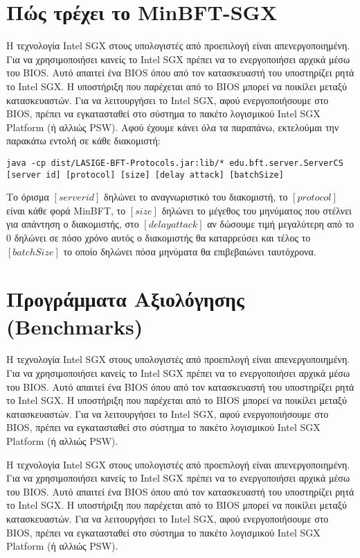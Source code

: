 \section{Πώς τρέχει το MinBFT-SGX}
Η τεχνολογία Intel SGX στους υπολογιστές από προεπιλογή είναι απενεργοποιημένη. Για να χρησιμοποιήσει κανείς το Intel SGX πρέπει να το ενεργοποιήσει αρχικά μέσω του BIOS. Αυτό απαιτεί ένα BIOS όπου από τον κατασκευαστή του υποστηρίζει ρητά το Intel SGX. Η υποστήριξη που παρέχεται από το BIOS μπορεί να ποικίλει μεταξύ κατασκευαστών. Για να λειτουργήσει το Intel SGX, αφού ενεργοποιήσουμε στο BIOS, πρέπει να εγκατασταθεί στο σύστημα το πακέτο λογισμικού Intel SGX Platform (ή αλλιώς PSW)\cite{linuxsgx}. 
Αφού έχουμε κάνει όλα τα παραπάνω, εκτελούμαι την παρακάτω εντολή σε κάθε διακομιστή: 
\begin{lstlisting}[style=mystyle] 
java -cp dist/LASIGE-BFT-Protocols.jar:lib/* edu.bft.server.ServerCS [server id] [protocol] [size] [delay attack] [batchSize]
\end{lstlisting}
Το όρισμα $[server id]$ δηλώνει το αναγνωριστικό του διακομιστή, το $[protocol]$ είναι κάθε φορά MinBFT, το $[size]$ δηλώνει το μέγεθος του μηνύματος που στέλνει για απάντηση ο διακομιστής, στο $[delay attack]$ αν δώσουμε τιμή μεγαλύτερη από το 0 δηλώνει σε πόσο χρόνο αυτός ο διακομιστής θα καταρρεύσει και τέλος το $[batchSize]$ το οποίο δηλώνει πόσα μηνύματα θα επιβεβαιώνει ταυτόχρονα.

\section{Προγράμματα Αξιολόγησης (Benchmarks)} \label{benchmarksSection}
Η τεχνολογία Intel SGX στους υπολογιστές από προεπιλογή είναι απενεργοποιημένη. Για να χρησιμοποιήσει κανείς το Intel SGX πρέπει να το ενεργοποιήσει αρχικά μέσω του BIOS. Αυτό απαιτεί ένα BIOS όπου από τον κατασκευαστή του υποστηρίζει ρητά το Intel SGX. Η υποστήριξη που παρέχεται από το BIOS μπορεί να ποικίλει μεταξύ κατασκευαστών. Για να λειτουργήσει το Intel SGX, αφού ενεργοποιήσουμε στο BIOS, πρέπει να εγκατασταθεί στο σύστημα το πακέτο λογισμικού Intel SGX Platform (ή αλλιώς PSW)\cite{linuxsgx}. 

Η τεχνολογία Intel SGX στους υπολογιστές από προεπιλογή είναι απενεργοποιημένη. Για να χρησιμοποιήσει κανείς το Intel SGX πρέπει να το ενεργοποιήσει αρχικά μέσω του BIOS. Αυτό απαιτεί ένα BIOS όπου από τον κατασκευαστή του υποστηρίζει ρητά το Intel SGX. Η υποστήριξη που παρέχεται από το BIOS μπορεί να ποικίλει μεταξύ κατασκευαστών. Για να λειτουργήσει το Intel SGX, αφού ενεργοποιήσουμε στο BIOS, πρέπει να εγκατασταθεί στο σύστημα το πακέτο λογισμικού Intel SGX Platform (ή αλλιώς PSW)\cite{linuxsgx}. 

